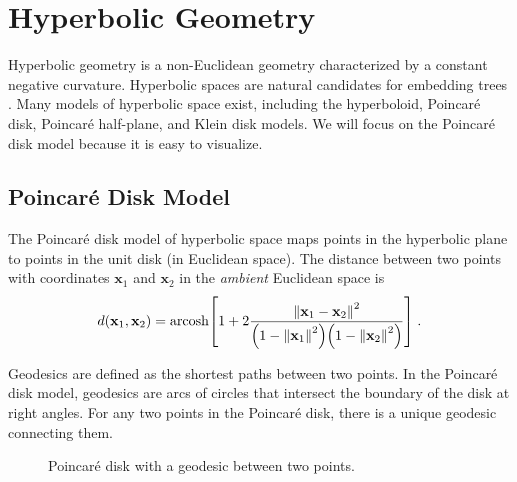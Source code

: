 \documentclass{article}
\begin{document}
\section{Hyperbolic Geometry}

Hyperbolic geometry is a non-Euclidean geometry characterized by a constant negative curvature. Hyperbolic spaces are natural candidates for embedding trees \cite{sarkar2011low} \cite{sala2018representation}. Many models of hyperbolic space exist, including the hyperboloid, Poincaré disk, Poincaré half-plane, and Klein disk models. We will focus on the Poincaré disk model because it is easy to visualize.

\subsection{Poincaré Disk Model}

The Poincaré disk model of hyperbolic space maps points in the hyperbolic plane to points in the unit disk (in Euclidean space). The distance between two points with coordinates $\mathbf x_1$ and $\mathbf x_2$ in the \emph{ambient} Euclidean space is
\begin{align}
  d(\mathbf x_1, \mathbf x_2)
  = \text{arcosh} \qty[1 + 2 \frac{\norm{\mathbf x_1 - \mathbf x_2}^2}{\qty(1 - \norm{\mathbf x_1}^2) \qty(1 - \norm{\mathbf x_2}^2)}] \; . \label{eq:poincare-distance}
\end{align}

Geodesics are defined as the shortest paths between two points. In the Poincaré disk model, geodesics are arcs of circles that intersect the boundary of the disk at right angles. For any two points in the Poincaré disk, there is a unique geodesic connecting them.

\begin{figure}[H]
  \centering
  \caption{Poincaré disk with a geodesic between two points.}
  \label{fig:poincare-disk}
\end{figure}
\end{document}
